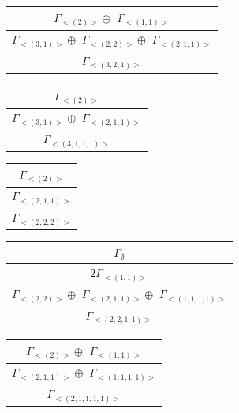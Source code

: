 \begin{minipage}{.5\textwidth}
\centering
\begin{tabular}{|c|}\hline
$\Gamma_{<(
2
)>} \oplus$
$\Gamma_{<(
1 , 
1
)>}$
\\ \hline
$\Gamma_{<(
3 , 
1
)>} \oplus$
$\Gamma_{<(
2 , 
2
)>} \oplus$
$\Gamma_{<(
2 , 
1 , 
1
)>}$
\\ \hline
$\Gamma_{<(
3 , 
2 , 
1
)>}$
\\
\hline\end{tabular}\end{minipage}
\begin{minipage}{.3\textwidth}
\centering
\begin{tabular}{|c|}\hline
$\Gamma_{<(
2
)>}$
\\ \hline
$\Gamma_{<(
3 , 
1
)>} \oplus$
$\Gamma_{<(
2 , 
1 , 
1
)>}$
\\ \hline
$\Gamma_{<(
3 , 
1 , 
1 , 
1
)>}$
\\
\hline\end{tabular}\end{minipage}
\bigskip
\begin{minipage}{.15\textwidth}
\centering
\begin{tabular}{|c|}\hline
$\Gamma_{<(
2
)>}$
\\ \hline
$\Gamma_{<(
2 , 
1 , 
1
)>}$
\\ \hline
$\Gamma_{<(
2 , 
2 , 
2
)>}$
\\
\hline\end{tabular}\end{minipage}
\begin{minipage}{.35\textwidth}
\centering
\begin{tabular}{|c|}\hline
$\Gamma_\emptyset$
\\ \hline
$ 2 \Gamma_{<(
1 , 
1
)>}$
\\ \hline
$\Gamma_{<(
2 , 
2
)>} \oplus$
$\Gamma_{<(
2 , 
1 , 
1
)>} \oplus$
$\Gamma_{<(
1 , 
1 , 
1 , 
1
)>}$
\\ \hline
$\Gamma_{<(
2 , 
2 , 
1 , 
1
)>}$
\\
\hline\end{tabular}\end{minipage}
\begin{minipage}{.4\textwidth}
\centering
\begin{tabular}{|c|}\hline
$\Gamma_{<(
2
)>} \oplus$
$\Gamma_{<(
1 , 
1
)>}$
\\ \hline
$\Gamma_{<(
2 , 
1 , 
1
)>} \oplus$
$\Gamma_{<(
1 , 
1 , 
1 , 
1
)>}$
\\ \hline
$\Gamma_{<(
2 , 
1 , 
1 , 
1 , 
1
)>}$
\\
\hline\end{tabular}\end{minipage}
